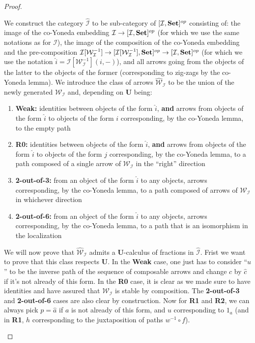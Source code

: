 \documentclass{article}
\numberwithin{equation}{section}
\theoremstyle{definition}
\theoremstyle{plain}
\newcommand{\Set}{\textnormal{\textbf{Set}}}
\begin{document}
\begin{proof}
\begin{enumerate}
		We construct the category $\widehat{\mathcal{I}}$ to be sub-category of $[\mathcal{I}, \Set]^{op}$ consisting of: the image of the co-Yoneda embedding $\mathcal{I} \to [\mathcal{I}, \Set]^{op}$ (for which we use the same notations as for $\mathcal{I}$), the image of the composition of the co-Yoneda embedding and the pre-composition $\mathcal{I}[\mathcal{W}_{\mathcal{I}}^{-1}] \to [\mathcal{I}[\mathcal{W}_{\mathcal{I}}^{-1}], \Set]^{op} \to [\mathcal{I}, \Set]^{op}$ (for which we use the notation $\widehat{i} = \mathcal{I}[\mathcal{W}^{-1}_{\mathcal{I}}](i,-)$), and all arrows going from the objects of the latter to the objects of the former (corresponding to zig-zags by the co-Yoneda lemma). We introduce the class of arrows $\widehat{\mathcal{W}}_{\mathcal{I}}$ to be the union of the newly generated $\mathcal{W}_{\mathcal{I}}$ and, depending on \textbf{U} being:
		\begin{enumerate}[label = $\bullet$]
			\item \textbf{Weak:} identities between objects of the form $\widehat{i}$, \textbf{and} arrows from objects of the form $\widehat{i}$ to objects of the form $i$ corresponding, by the co-Yoneda lemma, to the empty path
			\item \textbf{R0:} identities between objects of the form $\widehat{i}$, \textbf{and} arrows from objects of the form $\widehat{i}$ to objects of the form $j$ corresponding, by the co-Yoneda lemma, to a path composed of a single arrow of $\mathcal{W}_{\mathcal{I}}$ in the ``right'' direction
			\item \textbf{2-out-of-3:} from an object of the form $\widehat{i}$ to any objects, arrows corresponding, by the co-Yoneda lemma, to a path composed of arrows of $\mathcal{W}_{\mathcal{I}}$ in whichever direction
			\item \textbf{2-out-of-6:} from an object of the form $\widehat{i}$ to any objects, arrows corresponding, by the co-Yoneda lemma, to a path that is an isomorphism in the localization
		\end{enumerate}
		
		We will now prove that $\widehat{\mathcal{W}}_{\mathcal{I}}$ admits a \textbf{U}-calculus of fractions in $\widehat{\mathcal{I}}$.  Frist we want to prove that this class respects \textbf{U}. In the \textbf{Weak} case, one just has to consider ``$u$'' to be the inverse path of the sequence of composable arrows and change $c$ by $\widehat{c}$ if it's not already of this form. In the \textbf{R0} case, it is clear as we made sure to have identities and have assured that $\mathcal{W}_{\mathcal{I}}$ is stable by composition. The \textbf{2-out-of-3} and \textbf{2-out-of-6} cases are also clear by construction. Now for \textbf{R1} and \textbf{R2}, we can always pick $p = \widehat{a}$ if $a$ is not already of this form, and $u$ corresponding to $1_a$ (and in \textbf{R1}, $h$ corresponding to the juxtaposition of paths $w^{-1}\circ f$).
		

\end{enumerate}
\end{proof}
\end{document}
